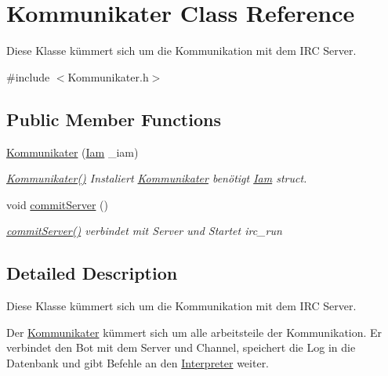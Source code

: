 \hypertarget{classKommunikater}{\section{\-Kommunikater \-Class \-Reference}
\label{classKommunikater}
}


\-Diese \-Klasse kümmert sich um die \-Kommunikation mit dem \-I\-R\-C \-Server.  




{\ttfamily \#include $<$\-Kommunikater.\-h$>$}

\subsection*{\-Public \-Member \-Functions}
\begin{DoxyCompactItemize}
\item 
\hyperlink{classKommunikater_acc1fbba41064320a938b1343f6e036db}{\-Kommunikater} (\hyperlink{structIam}{\-Iam} \-\_\-iam)
\begin{DoxyCompactList}\small\item\em \hyperlink{classKommunikater_acc1fbba41064320a938b1343f6e036db}{\-Kommunikater()} \-Instaliert \hyperlink{classKommunikater}{\-Kommunikater} benötigt \hyperlink{structIam}{\-Iam} struct. \end{DoxyCompactList}\item 
void \hyperlink{classKommunikater_a731ee5201102af91897a8cda45b71eac}{commit\-Server} ()
\begin{DoxyCompactList}\small\item\em \hyperlink{classKommunikater_a731ee5201102af91897a8cda45b71eac}{commit\-Server()} verbindet mit \-Server und \-Startet irc\-\_\-run \end{DoxyCompactList}\end{DoxyCompactItemize}


\subsection{\-Detailed \-Description}
\-Diese \-Klasse kümmert sich um die \-Kommunikation mit dem \-I\-R\-C \-Server. 

\-Der \hyperlink{classKommunikater}{\-Kommunikater} kümmert sich um alle arbeitsteile der \-Kommunikation. \-Er verbindet den \-Bot mit dem \-Server und \-Channel, speichert die \-Log in die \-Datenbank und gibt \-Befehle an den \hyperlink{classInterpreter}{\-Interpreter} weiter. 

